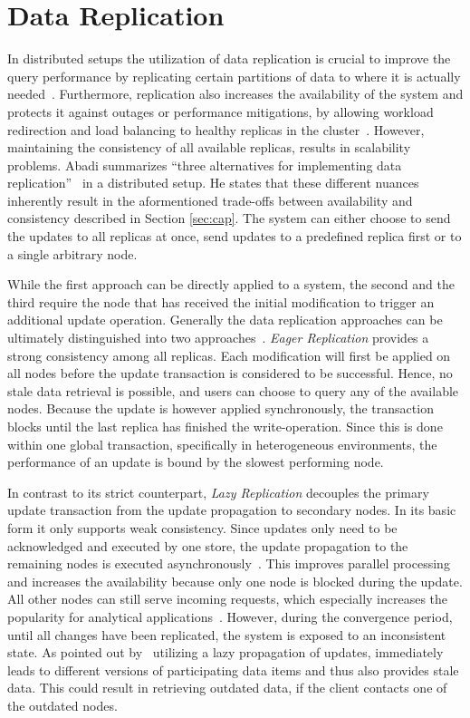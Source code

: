 


\section{Data Replication}

In distributed setups the utilization of data replication is crucial to improve the query performance
by replicating certain partitions of data to where it is actually needed~\cite{cloudpart_2012}.
Furthermore, replication also increases the availability of the system and protects it against outages or performance mitigations,
by allowing workload redirection and load balancing to healthy replicas in the cluster~\cite{quorums:2003}.
However, maintaining the consistency of all available replicas, results in scalability problems.
Abadi summarizes ``three alternatives for implementing data replication''~\cite{abadi2012} in a distributed setup.
He states that these different nuances inherently result in the aformentioned trade-offs between availability and consistency described in Section \ref{sec:cap}.
The system can either choose to send the updates to all replicas at once, send updates to a predefined replica first or to a single arbitrary node.

While the first approach can be directly applied to a system, the second and the third require the node that has received the initial modification to trigger an additional update operation.
Generally the data replication approaches can be ultimately distinguished into two approaches~\cite{gray:1996}.
\emph{Eager Replication} provides a strong consistency among all replicas. Each modification will first be applied on all nodes
before the update transaction is considered to be successful. Hence, no stale data retrieval is possible, and users can choose to query any of the available nodes.
Because the update is however applied synchronously, the transaction blocks until the last replica has finished the write-operation. 
Since this is done within one global transaction, specifically in heterogeneous environments, the performance of an update is bound by the slowest performing node.

In contrast to its strict counterpart, \emph{Lazy Replication} decouples the primary update transaction from the update propagation to secondary nodes.
In its basic form it only supports weak consistency. Since updates only need to be acknowledged and executed by one store, 
the update propagation to the remaining nodes is executed asynchronously~\cite{fekete:2018}.
This improves parallel processing and increases the availability because only one node is blocked during the update. All other nodes can still serve incoming requests,
which especially increases the popularity for analytical applications~\cite{daudjee:2006}.
However, during the convergence period, until all changes have been replicated, the system is exposed to an inconsistent state.
As pointed out by~\cite{cho:2000} utilizing a lazy propagation of updates, immediately leads to different versions of participating data items and thus also provides stale data.
This could result in retrieving outdated data, if the client contacts one of the outdated nodes.

